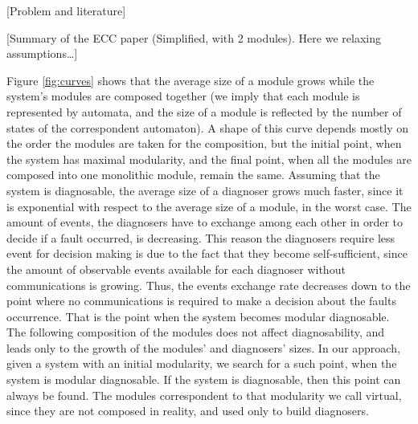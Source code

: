 \documentclass[a4paper, 10pt, conference]{ieeeconf}
\begin{document}
[Problem and literature]

[Summary of the ECC paper (Simplified, with 2 modules). Here we relaxing
assumptions\ldots]

Figure \ref{fig:curves} shows that the average size of a module grows while the
system's modules are composed together (we imply that each module is represented
by automata, and the size of a module is reflected by the number of states of
the correspondent automaton).
A shape of this curve depends mostly on the order the modules are taken for the
composition, but the initial point, when the system has maximal modularity, and
the final point, when all the modules are composed into one monolithic module,
remain the same. Assuming that the system is diagnosable, the average size of a
diagnoser grows much faster, since it is exponential with respect to the average
size of a module, in the worst case.
The amount of events, the diagnosers have to exchange among each other in order
to decide if a fault occurred, is decreasing. This reason the diagnosers require
less event for decision making is due to the fact that they become
self-sufficient, since the amount of observable events available for each
diagnoser without communications is growing. Thus, the events exchange rate
decreases down to the point where no communications is required to make a
decision about the faults occurrence. That is the point when the system becomes
modular diagnosable. The following composition of the modules does not affect
diagnosability, and leads only to the growth of the modules' and diagnosers'
sizes. In our approach, given a system with an initial modularity, we search for
a such point, when the system is modular diagnosable. If the system is
diagnosable, then this point can always be found. The modules correspondent to
that modularity we call virtual, since they are not composed in reality, and
used only to build diagnosers.
\end{document}

